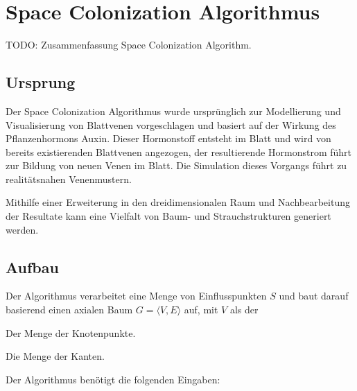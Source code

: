 \chapter{Space Colonization Algorithmus}

TODO: Zusammenfassung Space Colonization Algorithm.

\section{Ursprung}
Der Space Colonization Algorithmus wurde ursprünglich zur Modellierung und Visualisierung von Blattvenen vorgeschlagen und basiert auf der Wirkung des Pflanzenhormons Auxin. Dieser Hormonstoff entsteht im Blatt und wird von bereits existierenden Blattvenen angezogen, der resultierende Hormonstrom führt zur Bildung von neuen Venen im Blatt. Die Simulation dieses Vorgangs führt zu realitätsnahen Venenmustern. \cite[Abschn. 2.5]{LeafVenation:05}

Mithilfe einer Erweiterung in den dreidimensionalen Raum und Nachbearbeitung der Resultate kann eine Vielfalt von Baum- und Strauchstrukturen generiert werden. \cite[Abschn. 1]{SpaceColonizationAlgorithm:07}

\section{Aufbau}

Der Algorithmus verarbeitet eine Menge von Einflusspunkten $S$ und baut darauf basierend einen axialen Baum $G = \langle V,E\rangle$ auf, mit $V$ als der

\begin{description}[labelindent]
	\item[\boldmath$V$] Der Menge der Knotenpunkte. \\
	
	\item[\boldmath$E$] Die Menge der Kanten. \\
\end{description}

Der Algorithmus benötigt die folgenden Eingaben:


